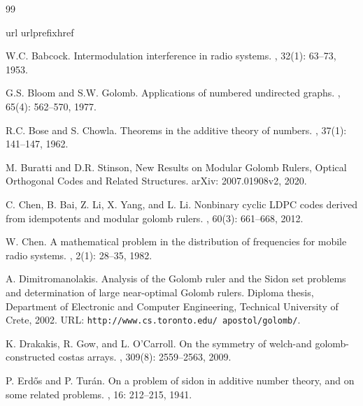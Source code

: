 \documentclass[preprint,12pt]{elsarticle}
\begin{document}
\begin{thebibliography}{99}

\expandafter\ifx\csname url\endcsname\relax
  \def\url#1{\texttt{#1}}\fi
\expandafter\ifx\csname urlprefix\endcsname\relax\def\urlprefix{URL
}\fi \expandafter\ifx\csname href\endcsname\relax
  \def\href#1#2{#2} \def\path#1{#1}\fi


W.C. Babcock.
\newblock Intermodulation interference in radio systems.
, 32(1): 63--73, 1953.

G.S. Bloom and S.W. Golomb.
\newblock Applications of numbered undirected graphs.
, 65(4): 562--570, 1977.

R.C. Bose and S. Chowla.
\newblock Theorems in the additive theory of numbers.
, 37(1): 141--147, 1962.

M. Buratti and D.R. Stinson,
New Results on Modular Golomb Rulers,
Optical Orthogonal Codes and Related Structures. 
arXiv: 2007.01908v2, 2020.


C. Chen, B. Bai, Z. Li, X. Yang, and L. Li.
\newblock Nonbinary cyclic LDPC codes derived from idempotents and modular
  golomb rulers.
, 60(3): 661--668, 2012.

W. Chen.
\newblock A mathematical problem in the distribution of frequencies for mobile
  radio systems.
,
  2(1): 28--35, 1982.

A. Dimitromanolakis.
\newblock  Analysis of the Golomb ruler and the Sidon set problems and
  determination of large near-optimal Golomb rulers.
\newblock Diploma thesis, Department of Electronic and Computer Engineering,
  Technical University of Crete, 2002.
\newblock URL: \url{http://www.cs.toronto.edu/~apostol/golomb/}.

K. Drakakis, R. Gow, and L. O'Carroll.
\newblock On the symmetry of welch-and golomb-constructed costas arrays.
, 309(8): 2559--2563, 2009.

P. Erd\H{o}s and P. Tur{\'a}n.
\newblock On a problem of sidon in additive number theory, and on some related
  problems.
, 16: 212--215, 1941.



\end{thebibliography}
\end{document}
